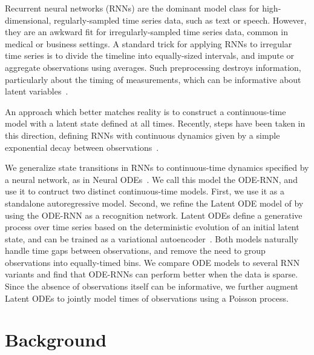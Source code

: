 \documentclass{article}
\begin{document}
Recurrent neural networks (RNNs) are the dominant model class for high-dimensional, regularly-sampled time series data, such as text or speech.
However, they are an awkward fit for irregularly-sampled time series data, common in medical or business settings. A standard trick for applying RNNs to irregular time series is to divide the timeline into equally-sized intervals, and impute or aggregate observations using averages.
Such preprocessing destroys information, particularly about the timing of measurements, which can be informative about latent variables~\citep{pmlr_Lipton16, che_sontag_2018}.


An approach which better matches reality is to construct a continuous-time model with a latent state defined at all times.
Recently, steps have been taken in this direction, defining RNNs with continuous dynamics given by a simple exponential decay between observations~\citep{che_sontag_2018, BRITS_2018, google_ehr_2018, neural_hawkes}.


We generalize state transitions in RNNs to continuous-time dynamics specified by a neural network, as in Neural ODEs~\citep{NeuralODE}.
We call this model the ODE-RNN, and use it to contruct two distinct continuous-time models.
First, we use it as a standalone autoregressive model.
Second, we refine the Latent ODE model of \citet{NeuralODE} by using the ODE-RNN as a recognition network.
Latent ODEs define a generative process over time series based on the deterministic evolution of an initial latent state, and can be trained as a variational autoencoder~\citep{kingma2013auto}.
Both models naturally handle time gaps between observations, and remove the need to group observations into equally-timed bins. We compare ODE models to several RNN variants and find that ODE-RNNs can perform better when the data is sparse.
Since the absence of observations itself can be informative, we further augment Latent ODEs to jointly model times of observations using a Poisson process.






\section{Background}
\end{document}
